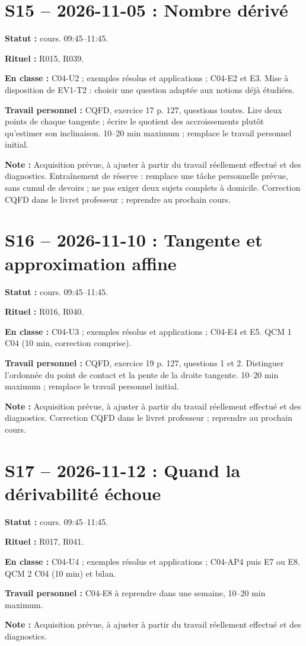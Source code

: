 \section*{S15 -- 2026-11-05 : Nombre dérivé}
\textbf{Statut :} cours. 09:45–11:45.\par\textbf{Rituel :} R015, R039.\par\textbf{En classe :} C04-U2 ; exemples résolus et applications ; C04-E2 et E3.  Mise à disposition de EV1-T2 : choisir une question adaptée aux notions déjà étudiées.\par\textbf{Travail personnel :} CQFD, exercice 17 p. 127, questions toutes. Lire deux points de chaque tangente ; écrire le quotient des accroissements plutôt qu’estimer son inclinaison. 10–20 min maximum ; remplace le travail personnel initial.\par\textbf{Note :} Acquisition prévue, à ajuster à partir du travail réellement effectué et des diagnostics. Entraînement de réserve : remplace une tâche personnelle prévue, sans cumul de devoirs ; ne pas exiger deux sujets complets à domicile. Correction CQFD dans le livret professeur ; reprendre au prochain cours.
\section*{S16 -- 2026-11-10 : Tangente et approximation affine}
\textbf{Statut :} cours. 09:45–11:45.\par\textbf{Rituel :} R016, R040.\par\textbf{En classe :} C04-U3 ; exemples résolus et applications ; C04-E4 et E5.  QCM 1 C04 (10 min, correction comprise).\par\textbf{Travail personnel :} CQFD, exercice 19 p. 127, questions 1 et 2. Distinguer l’ordonnée du point de contact et la pente de la droite tangente. 10–20 min maximum ; remplace le travail personnel initial.\par\textbf{Note :} Acquisition prévue, à ajuster à partir du travail réellement effectué et des diagnostics. Correction CQFD dans le livret professeur ; reprendre au prochain cours.
\section*{S17 -- 2026-11-12 : Quand la dérivabilité échoue}
\textbf{Statut :} cours. 09:45–11:45.\par\textbf{Rituel :} R017, R041.\par\textbf{En classe :} C04-U4 ; exemples résolus et applications ; C04-AP4 puis E7 ou E8.  QCM 2 C04 (10 min) et bilan.\par\textbf{Travail personnel :} C04-E8 à reprendre dans une semaine, 10–20 min maximum.\par\textbf{Note :} Acquisition prévue, à ajuster à partir du travail réellement effectué et des diagnostics.
